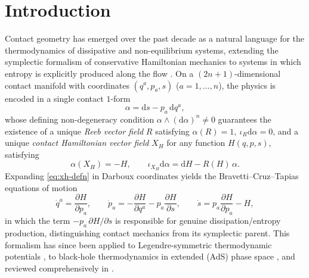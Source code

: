 \documentclass[11pt]{article}
\newcommand{\dif}{\mathrm{d}}
\begin{document}
\section{Introduction}

Contact geometry has emerged over the past decade as a natural language for the thermodynamics of dissipative and non-equilibrium systems, extending the symplectic formalism of conservative Hamiltonian mechanics to systems in which entropy is explicitly produced along the flow \cite{bravetti2017contact,bravetti2015symmetries}. On a $(2n+1)$-dimensional contact manifold with coordinates $(q^a, p_a, s)$ ($a=1,\dots,n$), the physics is encoded in a single contact $1$-form
\begin{equation}
\alpha = \dif s - p_a\,\dif q^a ,
\label{eq:alpha}
\end{equation}
whose defining non-degeneracy condition $\alpha\wedge(\dif\alpha)^n \neq 0$ guarantees the existence of a unique \emph{Reeb vector field} $R$ satisfying $\alpha(R)=1,\ \iota_R\dif\alpha = 0$, and a unique \emph{contact Hamiltonian vector field} $X_H$ for any function $H(q,p,s)$, satisfying
\begin{equation}
\alpha(X_H) = -H, \qquad \iota_{X_H}\dif\alpha = \dif H - R(H)\,\alpha .
\label{eq:xh-defn}
\end{equation}
Expanding \eqref{eq:xh-defn} in Darboux coordinates yields the Bravetti--Cruz--Tapias equations of motion
\begin{equation}
\dot q^a = \frac{\partial H}{\partial p_a}, \qquad
\dot p_a = -\frac{\partial H}{\partial q^a} - p_a \frac{\partial H}{\partial s}, \qquad
\dot s = p_a\frac{\partial H}{\partial p_a} - H ,
\label{eq:bravetti-eom}
\end{equation}
in which the term $-p_a\,\partial H/\partial s$ is responsible for genuine dissipation/entropy production, distinguishing contact mechanics from its symplectic parent. This formalism has since been applied to Legendre-symmetric thermodynamic potentials \cite{bravetti2015symmetries}, to black-hole thermodynamics in extended (AdS) phase space \cite{ghosh2019contact}, and reviewed comprehensively in \cite{deleon2021review}.
\end{document}
